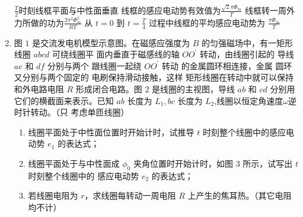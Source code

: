 \begin{enumerate}
\fourchoices
{$ \frac{T}{2} $时刻线框平面与中性面垂直}
{线框的感应电动势有效值为$\frac{\sqrt{2} \pi \Phi_{m}}{T}$}
{线框转一周外力所做的功为$\frac{2 \pi^{2} \Phi_{m}^{2}}{R T}$}
{从 $t=0$ 到 $t=\frac{T}{4}$ 过程中线框的平均感应电动势为 $\frac{\pi \Phi_{m}}{T}$}




\item 
{}
图 $ 1 $ 是交流发电机模型示意图。在磁感应强度为 $ B $ 的匀强磁场中，有一矩形线圈 $ abcd $ 可绕线圈平
面内垂直于磁感线的轴
$ OO ^{\prime} $ 转动，由线圈引起的
导线 $ ae $ 和 $ df $ 分别与两个
跟线圈一起绕 $ OO ^{\prime} $ 转动
的金属圆环相连接，金属
圆环又分别与两个固定的
电刷保持滑动接触，这样
矩形线圈在转动中就可以保持和外电路电阻 $ R $ 形成闭合电路。图 $ 2 $ 是线圈的主视图，导线 $ ab $ 和 $ cd $
分别用它们的横截面来表示。已知 $ ab $ 长度为 $ L_{1} ,bc $ 长度为 $ L_{2} $,线圈以恒定角速度$ \omega $逆时针转动。（只
考虑单匝线圈）
\begin{enumerate}
\item
线圈平面处于中性面位置时开始计时，试推导 $ t $ 时刻整个线圈中的感应电动势 $ e_{1} $ 的表达式；

\item 
线圈平面处于与中性面成 $ \phi_{0} $ 夹角位置时开始计时，如图 $ 3 $ 所示，试写出 $ t $ 时刻整个线圈中的
感应电动势 $ e_{2} $ 的表达式；

\item 
若线圈电阻为 $ r $，求线圈每转动一周电阻 $ R $ 上产生的焦耳热。（其它电阻均不计）




\end{enumerate}
\begin{figure}[h!]
\centering
\begin{subfigure}{0.4\linewidth}
\centering
 
\caption{}\label{}
\end{subfigure}
\begin{subfigure}{0.4\linewidth}
\centering
 
\caption{}\label{}
\end{subfigure}
\begin{subfigure}{0.4\linewidth}
\centering
 
\caption{}\label{}
\end{subfigure}
\end{figure}



\end{enumerate}
